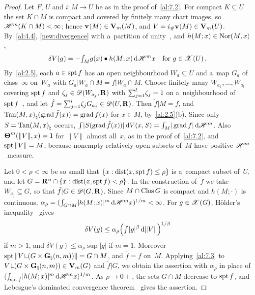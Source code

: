 \begin{proof}
    Let $F$, $U$ and $i : M \to U$ be as in the proof of~\ref{al:7.2}. For compact $K \subseteq U$
    the set $K \cap M$ is compact and covered by finitely many chart images, so $\mathscr{H}^m(K \cap M) <
    \infty$; hence $\mathbf{v}_{}(M) \in \mathbf{V}_{m}(M)$, and $V = i_\# \mathbf{v}_{}(M) \in \mathbf{V}_{m}(U)$. By~\ref{al:4.4},
    \ref{new:divergence} with a~partition of unity~\cite[3.1.13]{Federer1969}, and $h(M;x) \in
    \operatorname{Nor}(M,x)$,
    \begin{displaymath}
        \delta V(g) = - {\textstyle\int_{M}^{}} g(x) \bullet h(M;x) \,\mathrm{d} \mathscr{H}^m x \quad \text{for $g \in \mathscr{X}(U)$}
        \,.
    \end{displaymath}
    By~\ref{al:2.5}, each $a \in \operatorname{spt} f$ has an open neighbourhood $W_a \subseteq U$ and a~map
    $G_a$ of class~$\infty$ on~$W_a$ with $G_a | W_a \cap M = f | W_a \cap M$. Choose finitely many
    $W_{a_1}, \ldots, W_{a_l}$ covering $\operatorname{spt} f$ and $\zeta_j \in \mathscr{D}(W_{a_j},\mathbf{R})$ with
    ${\textstyle\sum_{j=1}^{l}} \zeta_j = 1$ on a~neighbourhood of $\operatorname{spt} f$~\cite[3.1.13]{Federer1969}, and
    let $\tilde f = {\textstyle\sum_{j=1}^{l}} \zeta_j G_{a_j} \in \mathscr{D}(U,\mathbf{R})$. Then $\tilde f | M = f$,
    and ${\operatorname{Tan}(M,x)}_\natural(\operatorname{grad} \tilde f(x)) = \operatorname{grad} f(x)$ for $x \in M$, by~\ref{al:2.5}(b).
    Since only $S = {\operatorname{Tan}(M,x)}_\natural$ occurs, ${\textstyle\int_{}^{}} |S(\operatorname{grad} \tilde f(x))| \,\mathrm{d} V(x,S) =
    {\textstyle\int_{M}^{}} |\operatorname{grad} f| \,\mathrm{d} \mathscr{H}^m$. Also $\boldsymbol{\Theta}^m(\|V\|,x) = 1$ for $\|V\|$ almost all~$x$,
    as in the proof of~\ref{al:7.2}, and $\operatorname{spt} \|V\| = M$, because nonempty relatively open subsets
    of~$M$ have positive $\mathscr{H}^m$~measure.

    Let $0 < \rho < \infty$ be so small that $\{ x : \operatorname{dist}(x, \operatorname{spt} f) \le \rho \}$ is a~compact
    subset of~$U$, and let $G = \mathbf{R}^{n} \cap \{ x : \operatorname{dist}(x, \operatorname{spt} f) < \rho \}$. In the
    construction of~$\tilde f$ we take $W_{a_j} \subseteq G$, so that $\tilde f | G \in
    \mathscr{D}(G,\mathbf{R})$. Since $M \cap \mathop{\mathrm{Clos}}G$ is compact and $h(M;\cdot)$ is continuous, $\alpha_\rho =
    ({\textstyle\int_{G \cap M}^{}} |h(M;x)|^m \,\mathrm{d} \mathscr{H}^m x)^{1/m} < \infty$. For $g \in \mathscr{X}(G)$, H\"older's
    inequality~\cite[2.4.14]{Federer1969} gives
    \begin{displaymath}
        \delta V(g) \le \alpha_\rho \Big( {\textstyle\int_{}^{}} |g|^\beta \,\mathrm{d} \|V\| \Big)^{1/\beta}
    \end{displaymath}
    if $m > 1$, and $\delta V(g) \le \alpha_\rho \sup |g|$ if $m = 1$. Moreover $\spt \|V \restrict (G
    \times \pgrass{\adim}{m})\| = G \cap M$, and $\tilde f = f$ on~$M$. Applying~\ref{al:7.3} to $V
    \restrict (G \times \pgrass{\adim}{m}) \in \Var{m}(G)$ and $\tilde f | G$, we obtain the
    assertion with $\alpha_\rho$ in place of $({\textstyle\int_{\operatorname{spt} f}^{}} |h(M;x)|^m \,\mathrm{d} \mathscr{H}^m x)^{1/m}$.
    As $\rho \to 0+$, the sets $G \cap M$ decrease to $\operatorname{spt} f$, and Lebesgue's dominated
    convergence theorem~\cite[2.4.9]{Federer1969} gives the assertion.
\end{proof}

